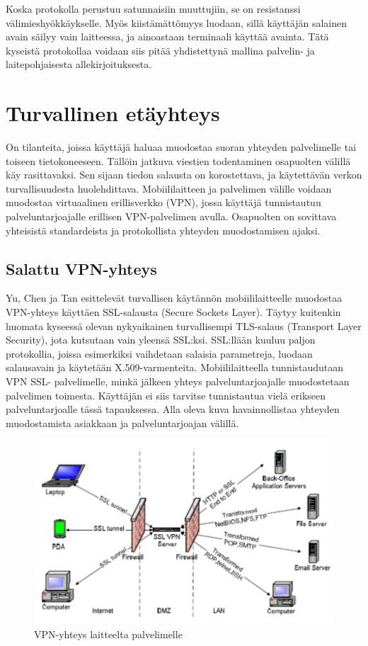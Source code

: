 \documentclass[finnish]{tktltiki2}
\theoremstyle{definition}
\theoremstyle{remark}
\begin{document}
Koska protokolla perustuu satunnaisiin muuttujiin, se on resistanssi välimieshyökkäykselle. Myös kiistämättömyys luodaan, sillä käyttäjän salainen avain säilyy vain laitteessa, ja ainoastaan terminaali käyttää avainta. Tätä kyseistä protokollaa voidaan siis pitää yhdistettynä mallina palvelin- ja laitepohjaisesta allekirjoituksesta.


\section{Turvallinen etäyhteys}

On tilanteita, joissa käyttäjä haluaa muodostaa suoran yhteyden palvelimelle tai toiseen tietokoneeseen. Tällöin jatkuva viestien todentaminen osapuolten välillä käy rasittavaksi. Sen sijaan tiedon salausta on korostettava, ja käytettävän verkon turvallisuudesta huolehdittava. Mobiililaitteen ja palvelimen välille voidaan muodostaa virtuaalinen erillisverkko (VPN), jossa käyttäjä tunnistautuu palveluntarjoajalle erillisen VPN-palvelimen avulla. Osapuolten on sovittava yhteisistä standardeista ja protokollista yhteyden muodostamisen ajaksi.

\subsection{Salattu VPN-yhteys}

Yu, Chen ja Tan \cite{vpn} esittelevät turvallisen käytännön mobiililaitteelle muodostaa VPN-yhteys käyttäen SSL-salausta (Secure Sockets Layer). Täytyy kuitenkin huomata kyseessä olevan nykyaikainen turvallisempi TLS-salaus (Transport Layer Security), jota kutsutaan vain yleensä SSL:ksi. SSL:llään kuuluu paljon protokollia, joissa esimerkiksi vaihdetaan salaisia parametreja, luodaan salausavain ja käytetään X.509-varmenteita. Mobiililaitteella tunnistaudutaan VPN SSL- palvelimelle, minkä jälkeen yhteys palveluntarjoajalle muodostetaan palvelimen toimesta. Käyttäjän ei siis tarvitse tunnistautua vielä erikseen palveluntarjoalle tässä tapauksessa. Alla oleva kuva havainnollistaa yhteyden muodostamista asiakkaan ja palveluntarjoajan välillä.

 
\begin{figure}[h!]
\centering
	\includegraphics[scale=0.47]{VPN-tunneli}
\caption{VPN-yhteys laitteelta palvelimelle \cite{vpn}}
\end{figure}	
\end{document}
